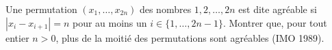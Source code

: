 Une permutation $(x_1, \ldots, x_{2n})$ des nombres $1, 2, \ldots, 2n$ est dite agréable si $|x_i - x_{i+1}| = n$ pour au moins un $i \in \{1, \ldots, 2n - 1\}$. Montrer que, pour tout entier $n > 0$, plus de la moitié des permutations sont agréables (IMO 1989).
